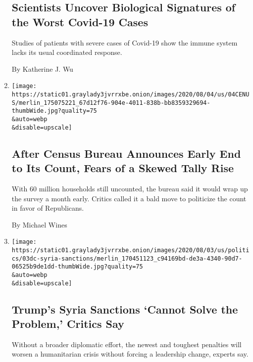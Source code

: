 \begin{enumerate}
{  \subsection{Scientists Uncover Biological Signatures of the Worst
  Covid-19
  Cases}\label{scientists-uncover-biological-signatures-of-the-worst-covid-19-cases}}

  Studies of patients with severe cases of Covid-19 show the immune
  system lacks its usual coordinated response.

  By Katherine J. Wu
\item
  \href{/2020/08/04/us/2020-census-ending-early.html}{}

  \texttt{[image: https://static01.graylady3jvrrxbe.onion/images/2020/08/04/us/04CENUS/merlin\_175075221\_67d12f76-904e-4011-838b-bb8359329694-thumbWide.jpg?quality=75\\\&auto=webp\\\&disable=upscale]}

  \hypertarget{after-census-bureau-announces-early-end-to-its-count-fears-of-a-skewed-tally-rise}{%
  \subsection{After Census Bureau Announces Early End to Its Count,
  Fears of a Skewed Tally
  Rise}\label{after-census-bureau-announces-early-end-to-its-count-fears-of-a-skewed-tally-rise}}

  With 60 million households still uncounted, the bureau said it would
  wrap up the survey a month early. Critics called it a bald move to
  politicize the count in favor of Republicans.

  By Michael Wines
\item
  \href{/2020/08/04/world/middleeast/trump-assad-syria-sanctions.html}{}

  \texttt{[image: https://static01.graylady3jvrrxbe.onion/images/2020/08/03/us/politics/03dc-syria-sanctions/merlin\_170451123\_c94169bd-de3a-4340-90d7-06525b9de1dd-thumbWide.jpg?quality=75\\\&auto=webp\\\&disable=upscale]}

  \hypertarget{trumps-syria-sanctions-cannot-solve-the-problem-critics-say}{%
  \subsection{Trump's Syria Sanctions `Cannot Solve the Problem,'
  Critics
  Say}\label{trumps-syria-sanctions-cannot-solve-the-problem-critics-say}}

  Without a broader diplomatic effort, the newest and toughest penalties
  will worsen a humanitarian crisis without forcing a leadership change,
  experts say.


\end{enumerate}
